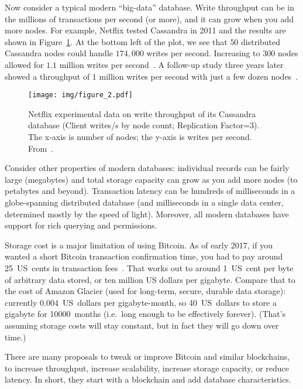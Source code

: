 \documentclass[a4paper]{article}
\begin{document}
Now consider a typical modern ``big-data'' database.
Write throughput can be in the millions of transactions per second (or more),
and it can grow when you add more nodes.
For example, Netflix tested Cassandra in 2011 and the results
are shown in Figure~\ref{fig:cassandra_throughput}.
At the bottom left of the plot, we see that $50$ distributed Cassandra nodes could handle $174,000$ writes per second.
Increasing to $300$ nodes allowed for $1.1$ million writes per second~\cite{cockcroft2011benchmarking}.
A follow-up study three years later showed a throughput of $1$ million writes per second with just a few dozen nodes~\cite{kalantzis_netflix}.


\begin{figure}[!ht]
  \centering
  \texttt{[image: img/figure\_2.pdf]}
  \caption{Netflix experimental data on write throughput of its Cassandra database (Client writes/s by node count; Replication Factor=$3$).
  The x-axis is number of nodes; the y-axis is writes per second.
  From~\cite{cockcroft2011benchmarking}.}
  \label{fig:cassandra_throughput}
\end{figure}


Consider other properties of modern databases:
individual records can be fairly large (megabytes)
and total storage capacity can grow as you add more nodes
(to petabytes and beyond).
Transaction latency can be hundreds of milliseconds
in a globe-spanning distributed database
(and milliseconds in a single data center,
determined mostly by the speed of light).
Moreover, all modern databases have support
for rich querying and permissions.

Storage cost is a major limitation of using Bitcoin.
As of early 2017,
if you wanted a short Bitcoin transaction confirmation time,
you had to pay around 25~US~cents
in transaction fees~\cite{bitcoin_tx_fees_2017}.
That works out to around 1~US~cent
per byte of arbitrary data stored,
or ten million US dollars per gigabyte.
Compare that to the cost of Amazon Glacier (used
for long-term, secure, durable data storage):
currently $0.004$~US~dollars per gigabyte-month,
so 40~US~dollars to store a gigabyte for 10000~months
(i.e.~long enough to be effectively forever).
(That's assuming storage costs will stay constant,
but in fact they will go down over time.)

There are many proposals to tweak or improve Bitcoin and similar blockchains,
to increase throughput, increase scalability, increase storage capacity, or reduce latency.
In short, they start with a blockchain and add database characteristics.
\end{document}
